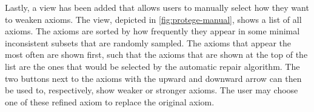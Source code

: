 Lastly, a view has been added that allows users to manually select how they want to weaken axioms. The view, depicted in \cref{fig:protege-manual}, shows a list of all axioms. The axioms are sorted by how frequently they appear in some minimal inconsistent subsets that are randomly sampled. The axioms that appear the most often are shown first, such that the axioms that are shown at the top of the list are the ones that would be selected by the automatic repair algorithm. The two buttons next to the axioms with the upward and downward arrow can then be used to, respectively, show weaker or stronger axioms. The user may choose one of these refined axiom to replace the original axiom.

